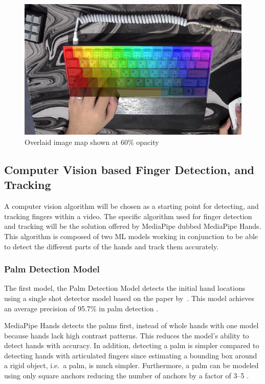 \documentclass{report}
\begin{document}
\hfill

\begin{figure}[H]
	\centering
	\includegraphics[width=1\textwidth]{image-map-half.png}
	\caption{Overlaid image map shown at 60\% opacity}
	\label{fig:metho-algo-key-half}
	\centering
\end{figure}

\subsection{Computer Vision based Finger Detection, and Tracking}
\label{section:metho-algo-finger}
A computer vision algorithm will be chosen as a starting point for detecting,
and tracking fingers within a video. The specific algorithm used for finger
detection and tracking will be the solution offered by MediaPipe dubbed
MediaPipe Hands. This algorithm is composed of two ML models working in
conjunction to be able to detect the different parts of the hands and track them
accurately.

\subsubsection{Palm Detection Model}
The first model, the Palm Detection Model detects the initial hand locations
using a single shot detector model based on the paper by~\cite{ssd}. This model
achieves an average precision of 95.7\% in palm detection
\parencite{mediapipe-hands}.

MediaPipe Hands detects the palms first, instead of whole hands with one model
because hands lack high contrast patterns. This reduces the model's ability to
detect hands with accuracy. In addition, detecting a palm is simpler compared
to detecting hands with articulated fingers since estimating a bounding box
around a rigid object, i.e.\ a palm, is much simpler. Furthermore, a palm can be
modeled using only square anchors reducing the number of anchors by a factor of
3--5 \parencite{mediapipe-hands}.
\end{document}
